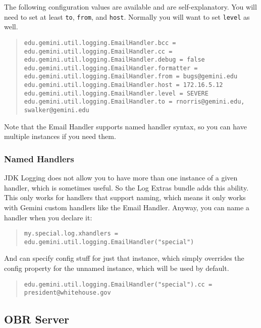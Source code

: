 \documentclass{report}
\begin{document}
\noindent The following configuration values are available and are 
self-explanatory. You will need to set at least {\tt to}, {\tt from}, and
{\tt host}. Normally you will want to set {\tt level} as well.

\begin{quote}\begin{scriptsize}\begin{verbatim}
edu.gemini.util.logging.EmailHandler.bcc =
edu.gemini.util.logging.EmailHandler.cc = 
edu.gemini.util.logging.EmailHandler.debug = false
edu.gemini.util.logging.EmailHandler.formatter =
edu.gemini.util.logging.EmailHandler.from = bugs@gemini.edu
edu.gemini.util.logging.EmailHandler.host = 172.16.5.12
edu.gemini.util.logging.EmailHandler.level = SEVERE
edu.gemini.util.logging.EmailHandler.to = rnorris@gemini.edu, swalker@gemini.edu
\end{verbatim}\end{scriptsize}\end{quote}


\noindent Note that the Email Handler supports named handler syntax, so you can have
multiple instances if you need them.


\subsubsection{Named Handlers}

JDK Logging does not allow you to have more than one instance of a given
handler, which is sometimes useful. So the Log Extras bundle adds this ability.
This only works for handlers that support naming, which means it only works with 
Gemini custom handlers like the Email Handler. Anyway, you can name a handler 
when you declare it:

\begin{quote}\begin{scriptsize}\begin{verbatim}
my.special.log.xhandlers = edu.gemini.util.logging.EmailHandler("special")
\end{verbatim}\end{scriptsize}\end{quote}

\noindent And can specify config stuff for just that instance, which simply overrides the
config property for the unnamed instance, which will be used by default.


\begin{quote}\begin{scriptsize}\begin{verbatim}
edu.gemini.util.logging.EmailHandler("special").cc = president@whitehouse.gov
\end{verbatim}\end{scriptsize}\end{quote}



\subsection{OBR Server}
\end{document}
